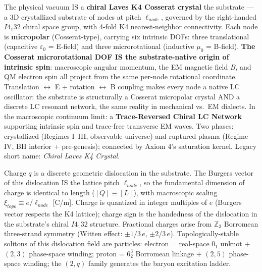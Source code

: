 \begin{axiom}
The physical vacuum IS a \textbf{chiral Laves K4 Cosserat crystal}
the substrate --- a 3D crystallized substrate of nodes at pitch $\ell_{node}$,
governed by the right-handed $I4_1 32$ chiral space group, with 4-fold K4
nearest-neighbor connectivity. Each node is \textbf{micropolar} (Cosserat-type),
carrying six intrinsic DOFs: three translational (capacitive $\varepsilon_0$
= E-field) and three microrotational (inductive $\mu_0$ = B-field).
\textbf{The Cosserat microrotational DOF IS the substrate-native origin of
intrinsic spin}: macroscopic angular momentum, the EM magnetic field $B$,
and QM electron spin all project from the same per-node rotational coordinate.
Translation $\leftrightarrow$ E + rotation $\leftrightarrow$ B coupling makes
every node a native LC oscillator: the substrate is structurally a Cosserat
micropolar crystal AND a discrete LC resonant network, the same reality in
mechanical vs.~EM dialects. In the macroscopic continuum limit: a
\textbf{Trace-Reversed Chiral LC Network} supporting intrinsic spin and
trace-free transverse EM waves. Two phases: crystallized (Regimes I--III,
observable universe) and ruptured plasma (Regime IV, BH interior +
pre-genesis); connected by Axiom 4's saturation kernel. Legacy short name:
\textit{Chiral Laves K4 Crystal}.
\end{axiom}

\begin{axiom}
Charge $q$ is a discrete geometric dislocation in the substrate. The Burgers
vector of this dislocation IS the lattice pitch $\ell_{node}$, so the fundamental
dimension of charge is identical to length ($[Q] \equiv [L]$), with macroscopic
scaling $\xi_{topo} \equiv e/\ell_{node}$ [C/m]. Charge is quantized in integer
multiples of $e$ (Burgers vector respects the K4 lattice); charge sign is the
handedness of the dislocation in the substrate's chiral $I4_1 32$ structure.
Fractional charges arise from $\mathbb{Z}_3$ Borromean three-strand symmetry
(Witten effect: $\pm 1/3\,e$, $\pm 2/3\,e$). Topologically-stable solitons of
this dislocation field are particles: electron = real-space $0_1$ unknot + $(2,3)$ phase-space winding;
proton = $6^3_2$ Borromean linkage + $(2,5)$ phase-space winding; the $(2,q)$ family generates
the baryon excitation ladder.
\end{axiom}

